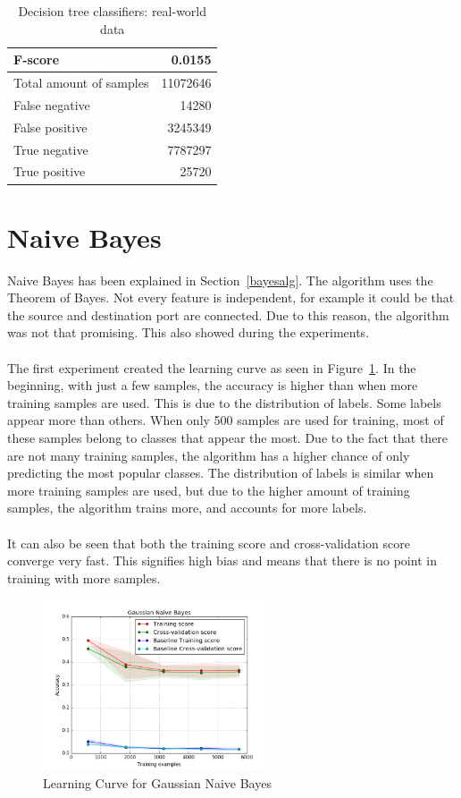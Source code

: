 \begin{table}[H]
\caption{Decision tree classifiers: real-world data}
\label{tab:tree:cegeka}
\centering
\begin{tabular}{l  r}
\toprule
F-score & 0.0155\\
\midrule
Total amount of samples & 11072646 \\
False negative & 14280  \\
False positive & 3245349 \\
True negative & 7787297 \\
True positive & 25720  \\
\bottomrule
\end{tabular}
\end{table}



\newpage
\section{Naive Bayes}

Naive Bayes has been explained in Section~\ref{bayesalg}. The algorithm uses the Theorem of Bayes. Not every feature is independent, for example it could be that the source and destination port are connected. Due to this reason, the algorithm was not that promising. This also showed during the experiments. \\
\\
The first experiment created the learning curve as seen in Figure~\ref{fig:naiveBayes}. In the beginning, with just a few samples, the accuracy is higher than when more training samples are used. This is due to the distribution of labels. Some labels appear more than others. When only 500 samples are used for training, most of these samples belong to classes that appear the most. Due to the fact that there are not many training samples, the algorithm has a higher chance of only predicting the most popular classes. The distribution of labels is similar when more training samples are used, but due to the higher amount of training samples, the algorithm trains more, and accounts for more labels.\\
\\
It can also be seen that both the training score and cross-validation score converge very fast. This signifies high bias and means that there is no point in training with more samples. 
 \begin{figure}[H]
\centering
\includegraphics[width=0.6\textwidth]{Figures/Gaussian_Naive_Bayes}
\decoRule
\caption[Learning Curve for Gaussian Naive Bayes]{Learning Curve for Gaussian Naive Bayes}
\label{fig:naiveBayes}
\end{figure}

